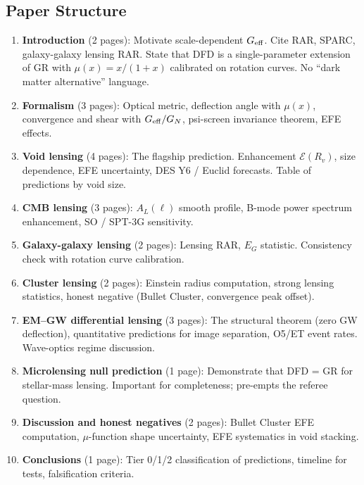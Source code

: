 \documentclass[11pt,a4paper]{article}
\newcommand{\Geff}{G_{\rm eff}}
\begin{document}
\subsection{Paper Structure}

\begin{enumerate}
\item \textbf{Introduction} (2 pages): Motivate scale-dependent $\Geff$.
  Cite RAR, SPARC, galaxy-galaxy lensing RAR.  State that DFD is a
  single-parameter extension of GR with $\mu(x) = x/(1+x)$ calibrated
  on rotation curves.  No ``dark matter alternative'' language.

\item \textbf{Formalism} (3 pages): Optical metric, deflection angle
  with $\mu(x)$, convergence and shear with $\Geff/G_N$, psi-screen
  invariance theorem, EFE effects.

\item \textbf{Void lensing} (4 pages): The flagship prediction.
  Enhancement $\mathcal{E}(R_v)$, size dependence, EFE uncertainty,
  DES Y6 / Euclid forecasts.  Table of predictions by void size.

\item \textbf{CMB lensing} (3 pages): $A_L(\ell)$ smooth profile,
  B-mode power spectrum enhancement, SO / SPT-3G sensitivity.

\item \textbf{Galaxy-galaxy lensing} (2 pages): Lensing RAR, $E_G$
  statistic.  Consistency check with rotation curve calibration.

\item \textbf{Cluster lensing} (2 pages): Einstein radius computation,
  strong lensing statistics, honest negative (Bullet Cluster, convergence
  peak offset).

\item \textbf{EM--GW differential lensing} (3 pages): The structural
  theorem (zero GW deflection), quantitative predictions for image
  separation, O5/ET event rates.  Wave-optics regime discussion.

\item \textbf{Microlensing null prediction} (1 page): Demonstrate that
  DFD = GR for stellar-mass lensing.  Important for completeness;
  pre-empts the referee question.

\item \textbf{Discussion and honest negatives} (2 pages): Bullet Cluster
  EFE computation, $\mu$-function shape uncertainty, EFE systematics
  in void stacking.

\item \textbf{Conclusions} (1 page): Tier 0/1/2 classification of
  predictions, timeline for tests, falsification criteria.
\end{enumerate}
\end{document}
